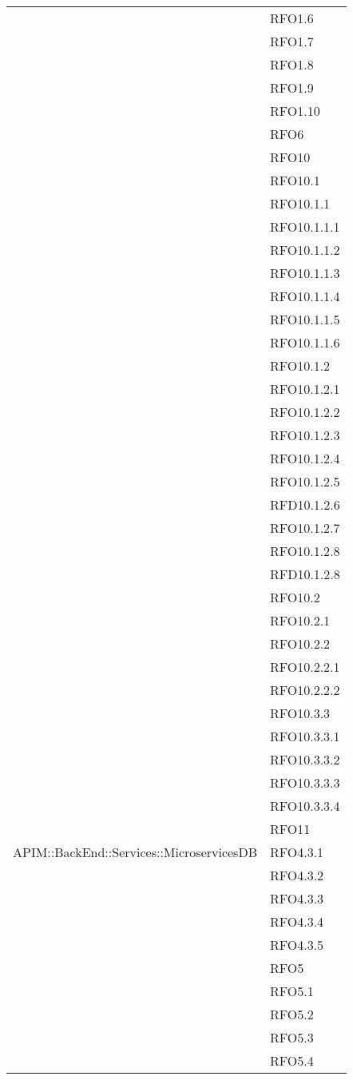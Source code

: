 \begin{longtable}{ p{12cm} | p{4cm} }
	& RFO1.6 \\
	& RFO1.7 \\
	& RFO1.8 \\
	& RFO1.9 \\
	& RFO1.10 \\
	& RFO6 \\
	& RFO10 \\
	& RFO10.1 \\
	& RFO10.1.1 \\
	& RFO10.1.1.1 \\
	& RFO10.1.1.2 \\
	& RFO10.1.1.3 \\
	& RFO10.1.1.4 \\
	& RFO10.1.1.5 \\
	& RFO10.1.1.6 \\
	& RFO10.1.2 \\
	& RFO10.1.2.1 \\
	& RFO10.1.2.2 \\
	& RFO10.1.2.3 \\
	& RFO10.1.2.4 \\
	& RFO10.1.2.5 \\
	& RFD10.1.2.6 \\
	& RFO10.1.2.7 \\
	& RFO10.1.2.8 \\
	& RFD10.1.2.8 \\
	& RFO10.2 \\
	& RFO10.2.1 \\
	& RFO10.2.2 \\
	& RFO10.2.2.1 \\
	& RFO10.2.2.2 \\
	& RFO10.3.3 \\
	& RFO10.3.3.1 \\
	& RFO10.3.3.2 \\
	& RFO10.3.3.3 \\
	& RFO10.3.3.4 \\
	& RFO11 \\
	\hline
	APIM::BackEnd::Services::MicroservicesDB
	& RFO4.3.1 \\
	& RFO4.3.2 \\
	& RFO4.3.3 \\
	& RFO4.3.4 \\
	& RFO4.3.5 \\
	& RFO5 \\
	& RFO5.1 \\
	& RFO5.2 \\
	& RFO5.3 \\
	& RFO5.4 \\

\end{longtable}
